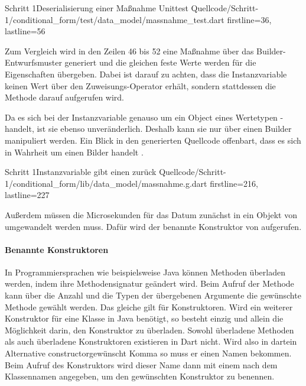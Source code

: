 \begin{alexlisting}{Schritt 1}{Deserialisierung einer Maßnahme Unittest}
  {Quellcode/Schritt-1/conditional_form/test/data_model/massnahme_test.dart}
  {firstline=36, lastline=56}
  \label{lst:DeserialisierungEinerMassnahmeUnittest}
\end{alexlisting}


Zum Vergleich wird in den Zeilen 46 bis 52 eine Maßnahme über das Builder-Entwurfsmuster generiert und die gleichen feste Werte werden für die Eigenschaften übergeben.
Dabei ist darauf zu achten, dass die Instanzvariable  keinen Wert über den Zuweisungs-Operator \IC{=} erhält, sondern stattdessen die Methode  darauf aufgerufen wird.

Da es sich bei der Instanzvariable  genauso um ein Object eines Wertetypen - handelt, ist sie ebenso unveränderlich. Deshalb kann sie nur über einen Builder manipuliert werden. Ein Blick in den generierten Quellcode offenbart, dass es sich in Wahrheit um einen Bilder handelt .

\begin{alexlisting}{Schritt 1}{Instanzvariable  gibt einen  zurück}
  {Quellcode/Schritt-1/conditional_form/lib/data_model/massnahme.g.dart}
  {firstline=216, lastline=227}
  \label{lst:Schritt1InstanzvariableLetzteBearbeitungGibtEinenLetzteBearbeitungBuilderZurueck}
\end{alexlisting}

Außerdem müssen die Microsekunden für das Datum zunächst in ein Objekt von  umgewandelt werden muss. Dafür wird der benannte Konstruktor  von   aufgerufen.

\paragraph{Benannte Konstruktoren} In Programmiersprachen wie beispielsweise Java können Methoden überladen werden, indem ihre Methodensignatur geändert wird. Beim Aufruf der Methode kann über die Anzahl und die Typen der übergebenen Argumente die gewünschte Methode gewählt werden. Das gleiche gilt für Konstruktoren. Wird ein weiterer Konstruktor für eine Klasse in Java benötigt, so besteht einzig und allein die Möglichkeit darin, den Konstruktor zu überladen. Sowohl überladene Methoden als auch überladene Konstruktoren existieren in Dart nicht. Wird also in dartein Alternative constructorgewünscht Komma so muss er einen Namen bekommen. Beim Aufruf des Konstruktors wird dieser Name dann mit einem  nach dem Klassennamen angegeben, um den gewünschten Konstruktor zu benennen.


